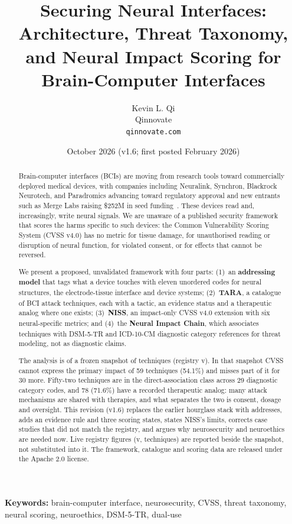 \documentclass[11pt,a4paper]{article}
\title{Securing Neural Interfaces: Architecture, Threat Taxonomy, and Neural Impact Scoring for Brain-Computer Interfaces}
\author{
  Kevin L. Qi\\
  Qinnovate\\
  \texttt{qinnovate.com}
}
\date{October 2026 (v1.6; first posted February 2026)}
\begin{document}
\maketitle

\begin{abstract}
Brain-computer interfaces (BCIs) are moving from research tools toward commercially
deployed medical devices, with companies including Neuralink, Synchron, Blackrock
Neurotech, and Paradromics advancing toward regulatory approval and new entrants such as
Merge Labs raising \$252M in seed funding~\cite{mergelabs2026}. These devices read and,
increasingly, write neural signals. We are unaware of a published security framework that
scores the harms specific to such devices: the Common Vulnerability Scoring System
(CVSS v4.0) has no metric for tissue damage, for unauthorised reading or disruption of
neural function, for violated consent, or for effects that cannot be reversed.

We present a proposed, unvalidated framework with four parts:
(1)~an \textbf{addressing model} that tags what a device touches with eleven unordered
codes for neural structures, the electrode-tissue interface and device systems;
(2)~\textbf{TARA}, a catalogue of BCI attack techniques, each with a tactic, an evidence
status and a therapeutic analog where one exists;
(3)~\textbf{NISS}, an impact-only CVSS v4.0 extension with six neural-specific metrics; and
(4)~the \textbf{Neural Impact Chain}, which associates techniques with DSM-5-TR and
ICD-10-CM diagnostic category references for threat modeling, not as diagnostic claims.

The analysis is of a frozen snapshot of \SnapshotTechniques{} techniques (registry
v\SnapshotRegistryVersion{}). In that snapshot CVSS cannot express the primary impact of
59 techniques (54.1\%) and misses part of it for 30 more. Fifty-two techniques are in the
direct-association class across 29 diagnostic category codes, and 78 (71.6\%) have a recorded
therapeutic analog: many attack mechanisms are shared with therapies, and what separates the
two is consent, dosage and oversight. This revision (v1.6) replaces the earlier hourglass
stack with addresses, adds an evidence rule and three scoring states, states NISS's limits,
corrects case studies that did not match the registry, and argues why neurosecurity and
neuroethics are needed now. Live registry figures (v\LiveRegistryVersion{},
\LiveTechniques{} techniques) are reported beside the snapshot, not substituted into it.
The framework, catalogue and scoring data are released under the Apache 2.0 license.
\end{abstract}

\noindent\textbf{Keywords:} brain-computer interface, neurosecurity, CVSS, threat taxonomy,
neural scoring, neuroethics, DSM-5-TR, dual-use

\tableofcontents
\newpage














\end{document}
